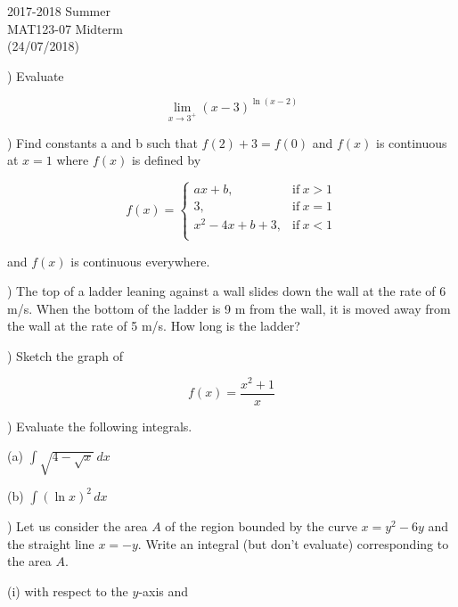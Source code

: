 \documentclass{article}
\begin{document}
\pagestyle{empty}
\large

\begin{center}
2017-2018 Summer\\MAT123-07 Midterm\\(24/07/2018)
\end{center}

) Evaluate

\begin{equation*}\lim_{x\to3^+}(x-3)^{\ln(x-2)}\end{equation*}

\hfill

) Find constants a and b such that $f(2) + 3 = f(0)$ and $f(x)$ is continuous at $x=1$ where $f(x)$ is defined by

\[
f(x) =
\begin{cases}
ax + b, & \text{if}\ x > 1 \\
3, & \text{if}\ x = 1 \\
x^2-4x+b+3, & \text{if}\ x < 1 \\
\end{cases}
\]

\noindent and $f(x)$ is continuous everywhere.

\hfill

) The top of a ladder leaning against a wall slides down the wall at the rate of 6 m/s. When the bottom of the ladder is 9 m from the wall, it is moved away from the wall at the rate of 5 m/s. How long is the ladder?

\hfill

) Sketch the graph of

\begin{equation*}f(x) = \frac{x^2+1}{x}\end{equation*}

\hfill

) Evaluate the following integrals.

\hfill

\noindent (a) $\displaystyle \int\sqrt{4-\sqrt{x}}\, dx$

\noindent (b) $\displaystyle \int(\ln x)^2\, dx$

\hfill

) Let us consider the area $A$ of the region bounded by the curve $x=y^2-6y$ and the straight line $x=-y$. Write an integral (but don't evaluate) corresponding to the area $A$.

\hfill

\noindent (i) with respect to the $y$-axis and
\end{document}
